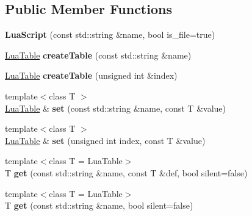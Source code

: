 \subsection*{Public Member Functions}
\begin{DoxyCompactItemize}
\item 
\mbox{\label{classTarbora_1_1LuaScript_ab25138ead841fabca8b091b85abb0d1a}} 
{\bfseries Lua\+Script} (const std\+::string \&name, bool is\+\_\+file=true)
\item 
\mbox{\label{classTarbora_1_1LuaScript_af65e0535bb6c265a3434ad037c6bdd84}} 
\hyperlink{classTarbora_1_1LuaTable}{Lua\+Table} {\bfseries create\+Table} (const std\+::string \&name)
\item 
\mbox{\label{classTarbora_1_1LuaScript_a8ef0c9f2edb2b723fd13d7a3a62a0584}} 
\hyperlink{classTarbora_1_1LuaTable}{Lua\+Table} {\bfseries create\+Table} (unsigned int \&index)
\item 
\mbox{\label{classTarbora_1_1LuaScript_ade1fdcb5ddfee421445f591518db6df4}} 
{\footnotesize template$<$class T $>$ }\\\hyperlink{classTarbora_1_1LuaTable}{Lua\+Table} \& {\bfseries set} (const std\+::string \&name, const T \&value)
\item 
\mbox{\label{classTarbora_1_1LuaScript_a4a1e48b299d2a3e17ff55453a3bf44e3}} 
{\footnotesize template$<$class T $>$ }\\\hyperlink{classTarbora_1_1LuaTable}{Lua\+Table} \& {\bfseries set} (unsigned int index, const T \&value)
\item 
\mbox{\label{classTarbora_1_1LuaScript_a142cb52d81b9fc2fbaa0dd0f3d99374d}} 
{\footnotesize template$<$class T  = Lua\+Table$>$ }\\T {\bfseries get} (const std\+::string \&name, const T \&def, bool silent=false)
\item 
\mbox{\label{classTarbora_1_1LuaScript_a69bffecb88cc2b695990fa7fe29575ed}} 
{\footnotesize template$<$class T  = Lua\+Table$>$ }\\T {\bfseries get} (const std\+::string \&name, bool silent=false)

\end{DoxyCompactItemize}
